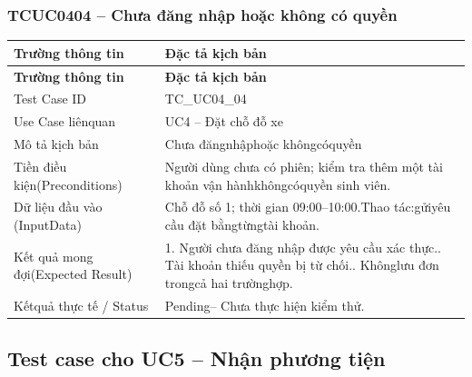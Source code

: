 \subsubsection{TCUC0404 – Chưa đăng nhập hoặc không có quyền}
\begin{longtable}{|L{0.24\textwidth}|L{0.70\textwidth}|}
\hline
\textbf{Trường thông tin} & \textbf{Đặc tả kịch bản} \\
\hline
\endfirsthead
\hline
\textbf{Trường thông tin} & \textbf{Đặc tả kịch bản} \\
\hline
\endhead
Test Case ID & TC\_UC04\_04 \\
\hline
Use Case liênquan & UC4 – Đặt chỗ đỗ xe \\
\hline
Mô tả kịch bản & Chưa đăngnhậphoặc khôngcóquyền \\
\hline
Tiền điều kiện\newline (Preconditions) & Người dùng chưa có phiên; kiểm tra thêm một tài khoản vận hành\newline khôngcóquyền sinh viên. \\
\hline
Dữ liệu đầu vào (Input\newline Data) & Chỗ đỗ số 1; thời gian 09:00–10:00.\newline Thao tác:gửiyêu cầu đặt bằngtừngtài khoản. \\
\hline
Kết quả mong đợi\newline (Expected Result) & 1. Người chưa đăng nhập được yêu cầu xác thực.. Tài khoản thiếu quyền bị từ chối.. Khônglưu đơn trongcả hai trườnghợp. \\
\hline
Kếtquả thực tế / Status & Pending– Chưa thực hiện kiểm thử. \\
\hline
\end{longtable}
\vspace{-0.5\baselineskip}
\subsection{Test case cho UC5 – Nhận phương tiện}
